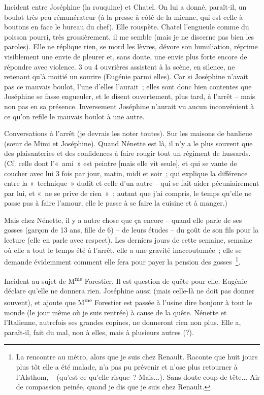 \documentclass[french,twoside]{book} %
\begin{document}
Incident entre Joséphine (la rouquine) et Chatel. On lui a donné, paraît-il, un boulot très peu rémunérateur (à la presse à côté de la mienne, qui est celle à boutons en face le bureau du chef). Elle rouspète. Chatel l'engueule comme du poisson pourri, très grossièrement, il me semble (mais je ne discerne pas bien les paroles). Elle ne réplique rien, se mord les lèvres, dévore son humiliation, réprime visiblement une envie de pleurer et, sans doute, une envie plus forte encore de répondre avec violence. 3 ou 4 ouvrières assistent à la scène, en silence, ne retenant qu'à moitié un sourire (Eugénie parmi elles). Car si Joséphine n'avait pas ce mauvais boulot, l'une d'elles l'aurait ; elles sont donc bien contentes que Joséphine se fasse engueuler, et le disent ouvertement, plus tard, à l'arrêt – mais non pas en sa présence. Inversement Joséphine n'aurait vu aucun inconvénient à ce qu'on refile le mauvais boulot à une autre.\par
Conversations à l'arrêt (je devrais les noter toutes). Sur les maisons de banlieue (sœur de Mimi et Joséphine). Quand Nénette est là, il n'y a le plus souvent que des plaisanteries et des confidences à faire rougir tout un régiment de hussards. (Cf. celle dont l'« ami » est peintre [mais elle vit seule], et qui se vante de coucher avec lui 3 fois par jour, matin, midi et soir ; qui explique la différence entre la « technique » dudit et celle d'un autre – qui se fait aider pécuniairement par lui, et « ne se prive de rien » ; autant que j'ai compris, le temps qu'elle ne passe pas à faire l'amour, elle le passe à se faire la cuisine et à manger.)\par
Mais chez Nénette, il y a autre chose que ça encore – quand elle parle de ses gosses (garçon de 13 ans, fille de 6) – de leurs études – du goût de son fils pour la lecture (elle en parle avec respect). Les derniers jours de cette semaine, semaine où elle a tout le temps été à l'arrêt, elle a une gravité inaccoutumée ; elle se demande évidemment comment elle fera pour payer la pension des gosses \footnote{La rencontre au métro, alors que je suis chez Renault. Raconte que huit jours plus tôt elle a été malade, n'a pas pu prévenir et n'ose plus retourner à l'Alsthom, – (qu'est-ce qu'elle risque ? Mais...). Sans doute coup de tête... Air de compassion peinée, quand je dis que je suis chez Renault.}.\par
Incident au sujet de M\textsuperscript{me} Forestier. Il est question de quête pour elle. Eugénie déclare qu'elle ne donnera rien. Joséphine aussi (mais celle-là ne doit pas donner souvent), et ajoute que M\textsuperscript{me} Forestier est passée à l'usine dire bonjour à tout le monde (le jour même où je suis rentrée) à cause de la quête. Nénette et l'Italienne, autrefois ses grandes copines, ne donneront rien non plus. Elle a, paraît-il, fait du mal, non à elles, mais à plusieurs autres (?).\par
\end{document}
